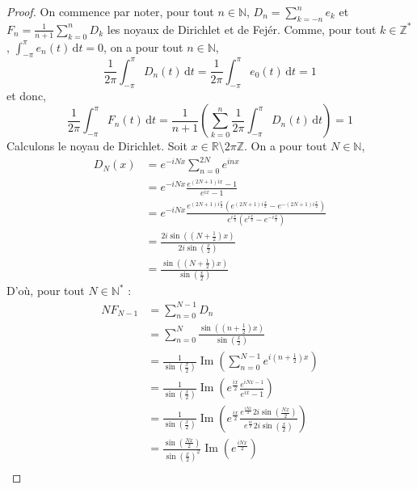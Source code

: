   \begin{proof}
    On commence par noter, pour tout $n \in \mathbb{N}$, $D_n = \sum_{k=-n}^n e_k$ et $F_n = \frac{1}{n+1} \sum_{k=0}^{n} D_k$ les noyaux de Dirichlet et de Fejér. Comme, pour tout $k \in \mathbb{Z}^*$, $\int_{-\pi}^{\pi} e_n(t) \, \mathrm{d}t = 0$, on a pour tout $n \in \mathbb{N}$,
    \[ \frac{1}{2\pi} \int_{-\pi}^{\pi} D_n(t) \, \mathrm{d}t = \frac{1}{2\pi} \int_{-\pi}^{\pi} e_0(t) \, \mathrm{d}t = 1 \]
    et donc,
    \[ \frac{1}{2\pi} \int_{-\pi}^{\pi} F_n(t) \, \mathrm{d}t = \frac{1}{n+1} \left( \sum_{k=0}^n \frac{1}{2\pi} \int_{-\pi}^{\pi} D_n(t) \, \mathrm{d}t \right) = 1 \tag{$*$} \]
    Calculons le noyau de Dirichlet. Soit $x \in \mathbb{R}\setminus 2\pi\mathbb{Z}$. On a pour tout $N \in \mathbb{N}$,
    \begin{align*}
      D_N(x) &= e^{-iNx} \sum_{n=0}^{2N} e^{inx} \\
      &= e^{-iNx} \frac{e^{(2N+1)ix} - 1}{e^{ix} - 1} \\
      &= e^{-iNx} \frac{e^{(2N+1) i\frac{x}{2}} \left ( e^{(2N+1) i\frac{x}{2}} - e^{-(2N+1) i\frac{x}{2}} \right )}{e^{i\frac{x}{2}} \left( e^{i\frac{x}{2}} - e^{-i \frac{x}{2}} \right)} \\
      &= \frac{2i \sin \left( \left( N + \frac{1}{2} \right) x \right)}{2i \sin \left ( \frac{x}{2} \right)} \\
      &= \frac{\sin \left( \left( N + \frac{1}{2} \right) x \right)}{\sin \left ( \frac{x}{2} \right)}
    \end{align*}
    D'où, pour tout $N \in \mathbb{N}^*$ :
    \begin{align*}
      NF_{N-1}&=\sum_{n=0}^{N-1}{D_n} \\
      &=\sum_{n=0}^{N}{\frac{\sin \left( \left( n + \frac{1}{2} \right) x \right)}{\sin \left ( \frac{x}{2} \right)}} \\
      &=\frac{1}{\sin \left ( \frac{x}{2} \right)}\operatorname{Im} \left( \sum_{n=0}^{N-1}{e^{i(n+\frac{1}{2})x}} \right) \\
      &=\frac{1}{\sin \left ( \frac{x}{2} \right)}\operatorname{Im} \left ( e^{\frac{ix}{2}}\frac{e^{iNx-1}}{e^{ix}-1} \right) \\
      &=\frac{1}{\sin \left ( \frac{x}{2} \right)} \operatorname{Im} \left ( e^{\frac{ix}{2}}\frac{e^{\frac{iNx}{2}}2i\sin \left( \frac{Nx}{2} \right)}{e^{\frac{ix}{2}}2i \sin \left ( \frac{x}{2} \right)} \right ) \\
      &=\frac{\sin \left( \frac{Nx}{2} \right)}{\sin \left ( \frac{x}{2} \right)^2}\operatorname{Im} \left(e^{\frac{iNx}{2}} \right) \\

\end{align*}
\end{proof}
